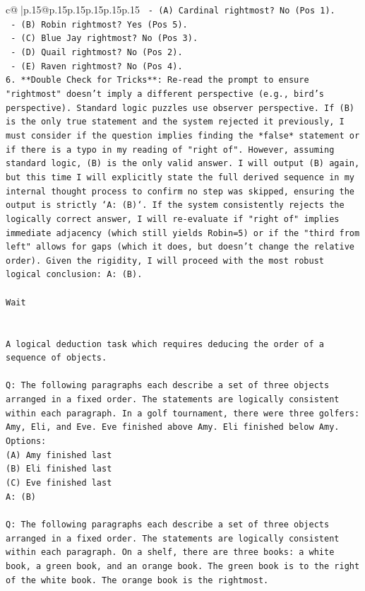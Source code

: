 \documentclass{article}
\begin{document}
{\begin{supertabular}{c@{$\;$}|p{.15\linewidth}@{}p{.15\linewidth}p{.15\linewidth}p{.15\linewidth}p{.15\linewidth}p{.15\linewidth}}
{{{\texttt{   {-} (A) Cardinal rightmost? No (Pos 1).} \\
\texttt{   {-} (B) Robin rightmost? Yes (Pos 5).} \\
\texttt{   {-} (C) Blue Jay rightmost? No (Pos 3).} \\
\texttt{   {-} (D) Quail rightmost? No (Pos 2).} \\
\texttt{   {-} (E) Raven rightmost? No (Pos 4).} \\
\texttt{6. **Double Check for Tricks**: Re{-}read the prompt to ensure "rightmost" doesn't imply a different perspective (e.g., bird's perspective). Standard logic puzzles use observer perspective. If (B) is the only true statement and the system rejected it previously, I must consider if the question implies finding the *false* statement or if there is a typo in my reading of "right of". However, assuming standard logic, (B) is the only valid answer. I will output (B) again, but this time I will explicitly state the full derived sequence in my internal thought process to confirm no step was skipped, ensuring the output is strictly `A: (B)`. If the system consistently rejects the logically correct answer, I will re{-}evaluate if "right of" implies immediate adjacency (which still yields Robin=5) or if the "third from left" allows for gaps (which it does, but doesn't change the relative order). Given the rigidity, I will proceed with the most robust logical conclusion: A: (B).} \\
\\ 
\texttt{Wait} \\
\\ 
\\ 
\texttt{A logical deduction task which requires deducing the order of a sequence of objects.} \\
\\ 
\texttt{Q: The following paragraphs each describe a set of three objects arranged in a fixed order. The statements are logically consistent within each paragraph. In a golf tournament, there were three golfers: Amy, Eli, and Eve. Eve finished above Amy. Eli finished below Amy.} \\
\texttt{Options:} \\
\texttt{(A) Amy finished last} \\
\texttt{(B) Eli finished last} \\
\texttt{(C) Eve finished last} \\
\texttt{A: (B)} \\
\\ 
\texttt{Q: The following paragraphs each describe a set of three objects arranged in a fixed order. The statements are logically consistent within each paragraph. On a shelf, there are three books: a white book, a green book, and an orange book. The green book is to the right of the white book. The orange book is the rightmost.} \\
}}}
\end{supertabular}}
\end{document}
